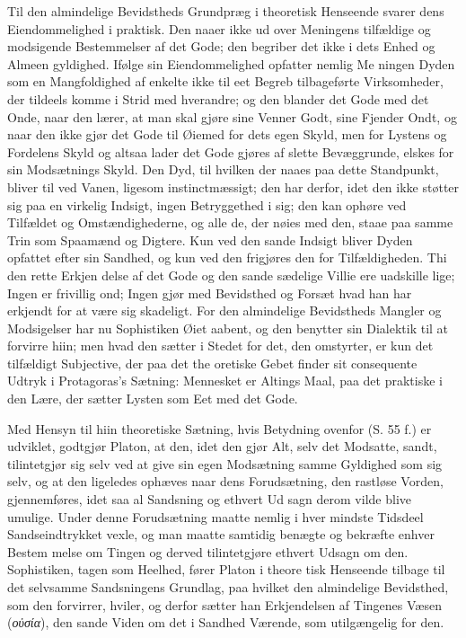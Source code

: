 \documentclass[12pt,a4paper]{book}
\newcommand{\gk}[1]{\textit{#1}}
\begin{document}
Til den almindelige Bevidstheds Grundpræg i theoretisk
Henseende svarer dens Eiendommelighed i praktisk. Den naaer
ikke ud over Meningens tilfældige og modsigende Bestemmelser
af det Gode; den begriber det ikke i dets Enhed og Almeen\-%
gyldighed. Ifølge sin Eiendommelighed opfatter nemlig Me\-%
ningen Dyden som en Mangfoldighed af enkelte ikke til eet
Begreb tilbageførte Virksomheder, der tildeels komme i Strid
med hverandre; og den blander det Gode med det Onde, naar
den lærer, at man skal gjøre sine Venner Godt, sine Fjender
Ondt, og naar den ikke gjør det Gode til Øiemed for dets
egen Skyld, men for Lystens og Fordelens Skyld og altsaa
lader det Gode gjøres af slette Bevæggrunde, elskes for sin
Modsætnings Skyld. Den Dyd, til hvilken der naaes paa dette
Standpunkt, bliver til ved Vanen, ligesom instinctmæssigt; den
har derfor, idet den ikke støtter sig paa en virkelig Indsigt,
ingen Betryggethed i sig; den kan ophøre ved Tilfældet og
Omstændighederne, og alle de, der nøies med den, staae paa
samme Trin som Spaamænd og Digtere. Kun ved den sande
Indsigt bliver Dyden opfattet efter sin Sandhed, og kun ved
den frigjøres den for Tilfældigheden. Thi den rette Erkjen\-%
delse af det Gode og den sande sædelige Villie ere uadskille\-%
lige; Ingen er frivillig ond; Ingen gjør med Bevidsthed og
Forsæt hvad han har erkjendt for at være sig skadeligt.
For den almindelige Bevidstheds Mangler og Modsigelser
har nu Sophistiken Øiet aabent, og den benytter sin Dialektik
til at forvirre hiin; men hvad den sætter i Stedet for det, den
omstyrter, er kun det tilfældigt Subjective, der paa det the\-%
oretiske Gebet finder sit consequente Udtryk i Protagoras's
Sætning: Mennesket er Altings Maal, paa det praktiske i den
Lære, der sætter Lysten som Eet med det Gode.

Med Hensyn til hiin theoretiske Sætning, hvis Betydning
ovenfor (S. 55 f.) er udviklet, godtgjør Platon, at den, idet den
gjør Alt, selv det Modsatte, sandt, tilintetgjør sig selv ved at
give sin egen Modsætning samme Gyldighed som sig selv, og
at den ligeledes ophæves naar dens Forudsætning, den rastløse
Vorden, gjennemføres, idet saa al Sandsning og ethvert Ud\-%
sagn derom vilde blive umulige. Under denne Forudsætning
maatte nemlig i hver mindste Tidsdeel Sandseindtrykket vexle,
og man maatte samtidig benægte og bekræfte enhver Bestem\-%
melse om Tingen og derved tilintetgjøre ethvert Udsagn om
den. Sophistiken, tagen som Heelhed, fører Platon i theore\-%
tisk Henseende tilbage til det selvsamme Sandsningens Grundlag,
paa hvilket den almindelige Bevidsthed, som den forvirrer,
hviler, og derfor sætter han Erkjendelsen af Tingenes Væsen
(\gk{οὐσία}), den sande Viden om det i Sandhed Værende, som
utilgængelig for den.
\end{document}
